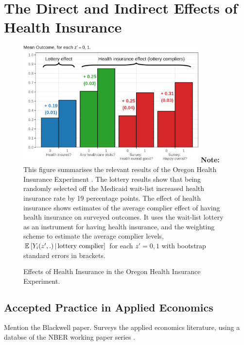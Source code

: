 \section{The Direct and Indirect Effects of Health Insurance}
\label{sec:healthinsurance}


\begin{figure}[h!]
    \caption{Effects of Health Insurance in the Oregon Health Insurance Experiment.}
    \centering
    \includegraphics[width=0.85\textwidth]{sections/figures/insurance-effects.png}
    \label{fig:healthinsurance-effects}
    \justify
    \footnotesize    
    \textbf{Note:}
    This figure summarises the relevant results of the Oregon Health Insurance Experiment \citep{finkelstein2008oregon}.
    The lottery results show that being randomly selected off the Medicaid wait-list increased health insurance rate by 19 percentage points.
    The effect of health insurance shows estimates of the average complier effect of having health insurance on surveyed outcomes.
    It uses the wait-list lottery as an instrument for having health insurance, and the \cite{abadie2003semiparametric} weighting scheme to estimate the average complier levels, $\mathbb{E}_{} \left[ Y_i(z',.) \, \middle\vert \, \text{lottery complier} \right]$ for each $z'=0,1$ with bootstrap standard errors in brackets.
\end{figure}


\subsection{Accepted Practice in Applied Economics}

Mention the Blackwell paper.
Surveys the applied economics literature, using a databse of the NBER working paper series \citep{garg2025causalclaimseconomics}.

